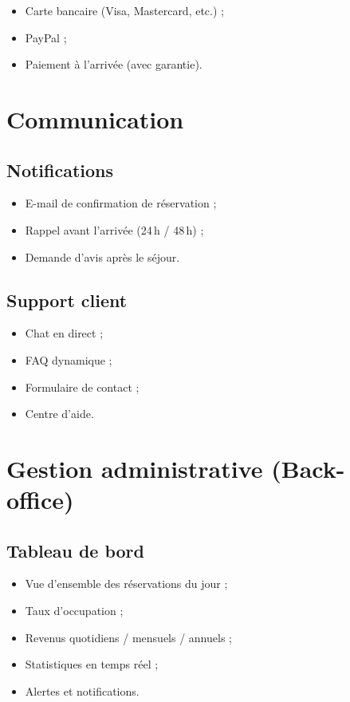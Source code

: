 \documentclass[12pt,a4paper]{report}
\begin{document}
\begin{itemize}
  \item Carte bancaire (Visa, Mastercard, etc.) ;
  \item PayPal ;
  \item Paiement à l'arrivée (avec garantie).
\end{itemize}

\section{Communication}

\subsection{Notifications}

\begin{itemize}
  \item E-mail de confirmation de réservation ;
  \item Rappel avant l'arrivée (24\,h / 48\,h) ;
  \item Demande d'avis après le séjour.
\end{itemize}

\subsection{Support client}

\begin{itemize}
  \item Chat en direct ;
  \item FAQ dynamique ;
  \item Formulaire de contact ;
  \item Centre d'aide.
\end{itemize}

\section{Gestion administrative (Back-office)}

\subsection{Tableau de bord}

\begin{itemize}
  \item Vue d'ensemble des réservations du jour ;
  \item Taux d'occupation ;
  \item Revenus quotidiens / mensuels / annuels ;
  \item Statistiques en temps réel ;
  \item Alertes et notifications.
\end{itemize}
\end{document}
